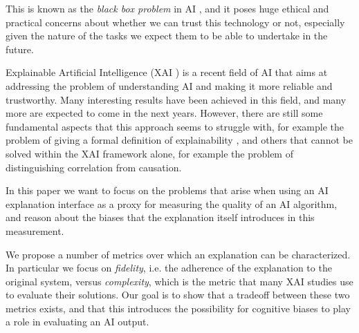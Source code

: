 \documentclass[conference]{IEEEtran}
\newcommand{\cit}[1][]{\todo[tickmarkheight=0.2cm]{cit #1}}
\begin{document}
This is known as the \textit{black box problem} in AI \cit, and it poses huge ethical and practical concerns about whether we can trust this technology or not, especially given the nature of the tasks we expect them to be able to undertake in the future.

Explainable Artificial Intelligence (XAI \cit) is a recent field of AI
that aims at addressing the problem of understanding AI and making it more reliable
and trustworthy. Many interesting results have been achieved in this field, and
many more are expected to come in the next years. However, there are still some
fundamental aspects that this approach seems to struggle with, for example the problem of giving a formal definition of explainability \cit, and others that cannot be solved within the XAI framework alone, for example the problem of distinguishing correlation from causation. \cit[?]

In this paper we want to focus on the problems that arise when using an AI explanation interface as a proxy for measuring the quality of an AI algorithm, and reason about the biases that the explanation itself introduces in this measurement.

We propose a number of metrics over which an explanation can be characterized. In particular we focus on \textit{fidelity}, i.e. the adherence of the explanation to the original system, versus \textit{complexity}, which is the metric that many XAI studies use to evaluate their solutions. Our goal is to show that a tradeoff between these two metrics exists, and that this introduces the possibility for cognitive biases to play a role in evaluating an AI output.


\end{document}
